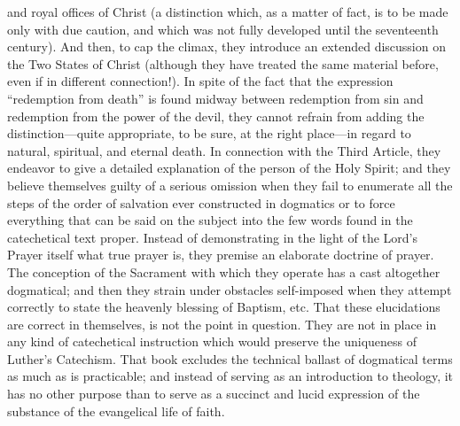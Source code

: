 and royal offices of Christ (a distinction which, as a matter of fact, is to be made only with due caution, and which was not fully developed until the seventeenth century). And then, to cap the climax, they introduce an extended discussion on the Two States of Christ (although they have treated the same material before, even if in different connection!). In spite of the fact that the expression “redemption from death” is found midway between redemption from sin and redemption from the power of the devil, they cannot refrain from adding the distinction—quite appropriate, to be sure, at the right place—in regard to natural, spiritual, and eternal death. In connection with the Third Article, they endeavor to give a detailed explanation of the person of the Holy Spirit; and they believe themselves guilty of a serious omission when they fail to enumerate all the steps of the order of salvation ever constructed in dogmatics or to force everything that can be said on the subject into the few words found in the catechetical text proper. Instead of demonstrating in the light of the Lord’s Prayer itself what true prayer is, they premise an elaborate doctrine of prayer. The conception of the Sacrament with which they operate has a cast altogether dogmatical; and then they strain under obstacles self-imposed when they attempt correctly to state the heavenly blessing of Baptism, etc. That these elucidations are correct in themselves, is not the point in question. They are not in place in any kind of catechetical instruction which would preserve the uniqueness of Luther’s Catechism. That book excludes the technical ballast of dogmatical terms as much as is practicable; and instead of serving as an introduction to theology, it has no other purpose than to serve as a succinct and lucid expression of the substance of the evangelical life of faith.

